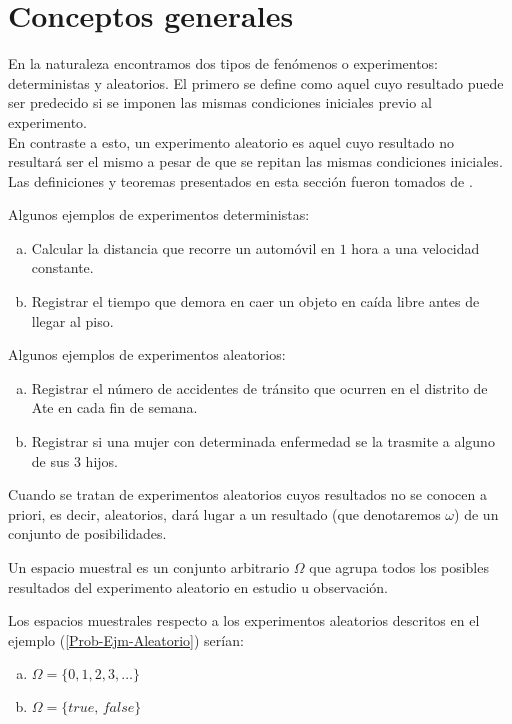 \section{Conceptos generales}
    En la naturaleza encontramos dos tipos de fenómenos o experimentos: deterministas y aleatorios. El primero se define como aquel cuyo resultado puede ser predecido si se imponen las mismas condiciones iniciales previo al experimento. \\
    En contraste a esto, un experimento aleatorio es aquel cuyo resultado no resultará ser el mismo a pesar de que se repitan las mismas condiciones iniciales.\\
    Las definiciones y teoremas presentados en esta sección fueron tomados de \cite{Rincon1} \cite{Rincon2}.
\begin{Ejm}
    Algunos ejemplos de experimentos deterministas:
    \begin{enumerate}[a)]
        \item Calcular la distancia que recorre un automóvil en $1$ hora a una velocidad constante.
        \item Registrar el tiempo que demora en caer un objeto en caída libre antes de llegar al piso.
    \end{enumerate}
\end{Ejm}
\begin{Ejm}
\label{Prob-Ejm-Aleatorio}
Algunos ejemplos de experimentos aleatorios:
    \begin{enumerate}[a)]
        \item Registrar el número de accidentes de tránsito que ocurren en el distrito de Ate en cada fin de semana.
        \item Registrar si una mujer con  determinada enfermedad se la trasmite a alguno de sus 3 hijos.
    \end{enumerate}
\end{Ejm}
Cuando se tratan de experimentos aleatorios cuyos resultados no se conocen a priori, es decir, aleatorios, dará lugar a un resultado (que denotaremos $\omega$) de un conjunto de posibilidades.
\begin{Def}
Un espacio muestral es un conjunto arbitrario $\Omega$ que agrupa todos los posibles resultados del experimento aleatorio en estudio u observación.
\end{Def}
\begin{Ejm}
Los espacios muestrales respecto a los experimentos aleatorios descritos en el ejemplo (\ref{Prob-Ejm-Aleatorio}) serían:
\begin{enumerate}[a)]
    \item $\Omega=\{0,1,2,3,\ldots\}$
    \item $\Omega=\{\textit{true, false}\}$
\end{enumerate}
\end{Ejm}
